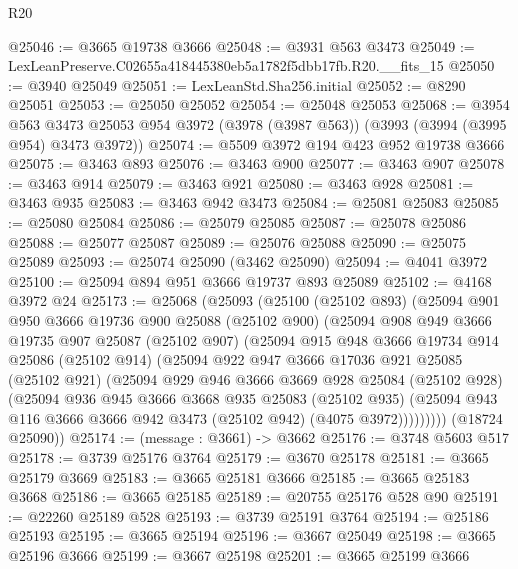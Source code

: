 \begin{lexlean}{R20}
\begin{coremodule}
@25046 := @3665 @19738 @3666
@25048 := @3931 @563 @3473
@25049 := LexLeanPreserve.C02655a418445380eb5a1782f5dbb17fb.R20.__fits_15
@25050 := @3940 @25049
@25051 := LexLeanStd.Sha256.initial
@25052 := @8290 @25051
@25053 := @25050 @25052
@25054 := @25048 @25053
@25068 := @3954
    @563
    @3473
    @25053
    @954
    @3972
    (@3978 (@3987 @563))
    (@3993 (@3994 (@3995 @954) @3473 @3972))
@25074 := @5509 @3972 @194 @423 @952 @19738 @3666
@25075 := @3463 @893
@25076 := @3463 @900
@25077 := @3463 @907
@25078 := @3463 @914
@25079 := @3463 @921
@25080 := @3463 @928
@25081 := @3463 @935
@25083 := @3463 @942 @3473
@25084 := @25081 @25083
@25085 := @25080 @25084
@25086 := @25079 @25085
@25087 := @25078 @25086
@25088 := @25077 @25087
@25089 := @25076 @25088
@25090 := @25075 @25089
@25093 := @25074 @25090 (@3462 @25090)
@25094 := @4041 @3972
@25100 := @25094 @894 @951 @3666 @19737 @893 @25089
@25102 := @4168 @3972 @24
@25173 := @25068
    (@25093
      (@25100
        (@25102 @893)
        (@25094
          @901
          @950
          @3666
          @19736
          @900
          @25088
          (@25102 @900)
          (@25094
            @908
            @949
            @3666
            @19735
            @907
            @25087
            (@25102 @907)
            (@25094
              @915
              @948
              @3666
              @19734
              @914
              @25086
              (@25102 @914)
              (@25094
                @922
                @947
                @3666
                @17036
                @921
                @25085
                (@25102 @921)
                (@25094
                  @929
                  @946
                  @3666
                  @3669
                  @928
                  @25084
                  (@25102 @928)
                  (@25094
                    @936
                    @945
                    @3666
                    @3668
                    @935
                    @25083
                    (@25102 @935)
                    (@25094 @943 @116 @3666 @3666 @942 @3473 (@25102 @942) (@4075 @3972)))))))))
      (@18724 @25090))
@25174 := (message : @3661) -> @3662
@25176 := @3748 @5603 @517
@25178 := @3739 @25176 @3764
@25179 := @3670 @25178
@25181 := @3665 @25179 @3669
@25183 := @3665 @25181 @3666
@25185 := @3665 @25183 @3668
@25186 := @3665 @25185
@25189 := @20755 @25176 @528 @90
@25191 := @22260 @25189 @528
@25193 := @3739 @25191 @3764
@25194 := @25186 @25193
@25195 := @3665 @25194
@25196 := @3667 @25049
@25198 := @3665 @25196 @3666
@25199 := @3667 @25198
@25201 := @3665 @25199 @3666

\end{coremodule}
\end{lexlean}

